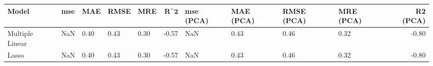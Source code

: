 \begin{table}
\centering
\label{table:iri_reg_pred}
\begin{tabular}{lllllrllllr}
\toprule
 \textbf{Model} & \textbf{mse} & \textbf{MAE} & \textbf{RMSE} & \textbf{MRE} & $\textbf{R^2}$ & \textbf{mse (PCA)} & \textbf{MAE (PCA)} & \textbf{RMSE (PCA)} & \textbf{MRE (PCA)} & \textbf{R2 (PCA)} \\
\midrule
Multiple Linear &          NaN &         0.40 &          0.43 &         0.30 &          -0.57 &                NaN &               0.43 &                0.46 &               0.32 &             -0.80 \\
          Lasso &          NaN &         0.40 &          0.43 &         0.30 &          -0.57 &                NaN &               0.43 &                0.46 &               0.32 &             -0.80 \\
\bottomrule
\end{tabular}
\end{table}
